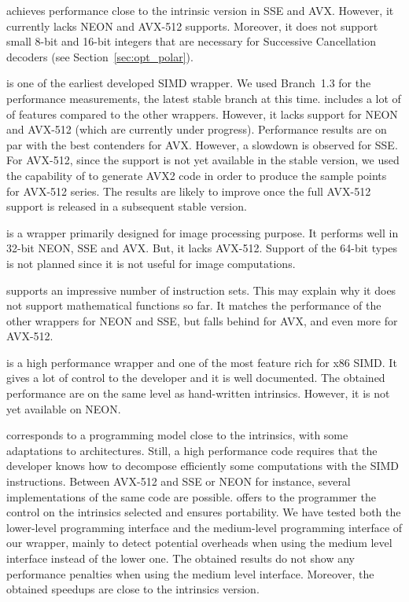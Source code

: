 \textbf{\xsimd} achieves performance close to the intrinsic version in SSE and
AVX. However, it currently lacks NEON and AVX-512 supports. Moreover, it does
not support small 8-bit and 16-bit integers that are necessary for Successive
Cancellation decoders (see Section~\ref{sec:opt_polar}).

\textbf{\Vc} is one of the earliest developed SIMD \Cxx wrapper. We used
Branch~1.3 for the performance measurements, the latest stable branch at this
time. \Vc includes a lot of of features compared to the other wrappers. However,
it lacks support for NEON and AVX-512 (which are currently under progress).
Performance results are on par with the best contenders for AVX. However, a
slowdown is observed for SSE. For AVX-512, since the support is not yet
available in the stable version, we used the capability of \Vc to generate AVX2
code in order to produce the sample points for AVX-512 series. The results are
likely to improve once the full AVX-512 support is released in a subsequent
stable version.

\textbf{\TSIMD} is a wrapper primarily designed for image processing purpose.
It performs well in 32-bit NEON, SSE and AVX. But, it lacks AVX-512. Support of
the 64-bit types is not planned since it is not useful for image computations.

\textbf{\simdpp} supports an impressive number of instruction
sets. This may explain why it does not support mathematical functions so far. It
matches the performance of the other wrappers for NEON and SSE, but falls behind
for AVX, and even more for AVX-512.

\textbf{\VCL} is a high performance wrapper and one of the most feature rich
for x86 SIMD. It gives a lot of control to the developer and it is
well documented. The obtained performance are on the same level as hand-written
intrinsics. However, it is not yet available on NEON.

\textbf{\MIPP} corresponds to a programming model close to the intrinsics, with
some adaptations to architectures. Still, a high performance code requires that
the developer knows how to decompose efficiently some computations with the SIMD
instructions. Between AVX-512 and SSE or NEON for instance, several
implementations of the same code are possible. \MIPP offers to the programmer
the control on the intrinsics selected and ensures portability. We have tested
both the lower-level programming interface and the medium-level programming
interface of our \MIPP wrapper, mainly to detect potential overheads when using
the medium level interface instead of the lower one. The obtained results do not
show any performance penalties when using the \MIPP medium level interface.
Moreover, the obtained speedups are close to the intrinsics version.

